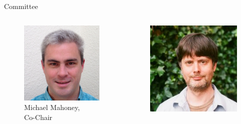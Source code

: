 \begin{frame}{Committee}
    \begin{columns}[c]
    \begin{column}{0.23\textwidth}
    \begin{figure}
        \centering
        \includegraphics[width=\textwidth]{Figures/intro/mmahoney.png}
        \caption{\tiny Michael Mahoney,\\ Co-Chair}
    \end{figure}
    \end{column}
    \begin{column}{0.23\textwidth}
    \begin{figure}
        \centering
        \includegraphics[width=\textwidth,clip,trim={0 0cm 0 0}]{Figures/intro/alan.jpg}

\end{figure}
\end{column}
\end{columns}
\end{frame}
